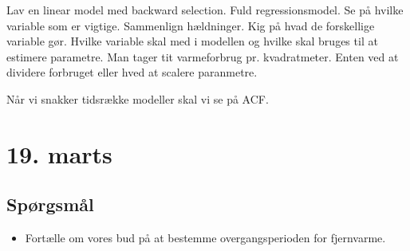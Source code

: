 Lav en linear model med backward selection. Fuld regressionsmodel. Se på hvilke variable som er vigtige. Sammenlign hældninger.
Kig på hvad de forskellige variable gør. Hvilke variable skal med i modellen og hvilke skal bruges til at estimere parametre.
Man tager tit varmeforbrug pr. kvadratmeter. Enten ved at dividere forbruget eller hved at scalere paranmetre.

Når vi snakker tidsrække modeller skal vi se på ACF.

\pagebreak

\section{19. marts}

\subsection{Spørgsmål}
\begin{itemize}
    \item Fortælle om vores bud på at bestemme overgangsperioden for fjernvarme.
\end{itemize}

